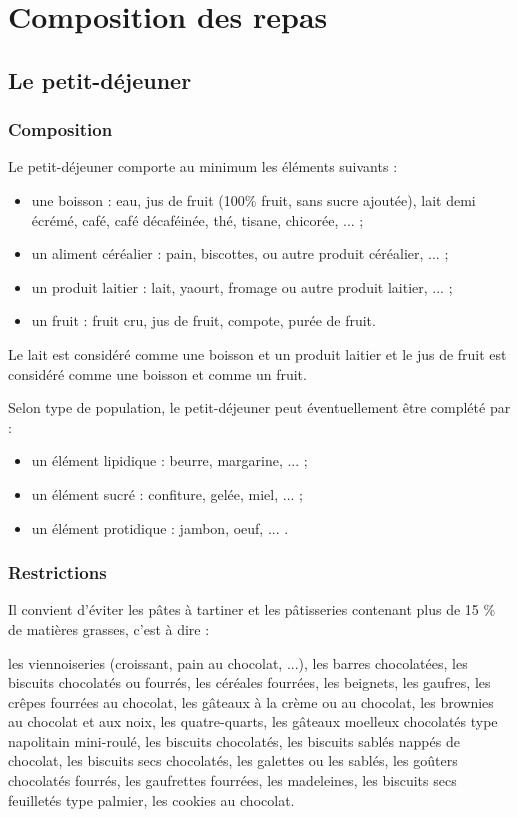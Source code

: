 \chapter{Composition des repas}

\label{annexeA}

\section{Le petit-déjeuner}

\subsection{Composition}

Le petit-déjeuner comporte au minimum les éléments suivants :
\begin{itemize}
	\item une boisson : eau, jus de fruit (100\% fruit, sans sucre ajoutée), lait demi écrémé, café, café décaféinée, thé, tisane, chicorée, ... ;
	\item un aliment céréalier : pain, biscottes, ou autre produit céréalier, ... ;
	\item un produit laitier : lait, yaourt, fromage ou autre produit laitier, ... ;
	\item un fruit : fruit cru, jus de fruit, compote, purée de fruit.
\end{itemize}

Le lait est considéré comme une boisson et un produit laitier et le jus de fruit est considéré comme une boisson et comme un fruit.

Selon type de population, le petit-déjeuner peut éventuellement être complété par :
\begin{itemize}
	\item un élément lipidique  : beurre, margarine, ... ;
	\item un élément sucré : confiture, gelée, miel, ... ;
	\item un élément protidique : jambon, oeuf, ... .
\end{itemize}

\subsection{Restrictions}

Il convient d'éviter les pâtes à tartiner et les pâtisseries contenant plus de 15 \% de matières grasses, c'est à dire :

les viennoiseries (croissant, pain au chocolat, ...), les barres chocolatées, les biscuits chocolatés ou fourrés, les céréales fourrées, les beignets, les gaufres, les crêpes fourrées au chocolat, les gâteaux à la crème ou au chocolat, les brownies au chocolat et aux noix, les quatre-quarts, les gâteaux moelleux chocolatés type napolitain mini-roulé, les biscuits chocolatés, les biscuits sablés nappés de chocolat, les biscuits secs chocolatés, les galettes ou les sablés, les goûters chocolatés fourrés, les gaufrettes fourrées, les madeleines, les biscuits secs feuilletés type palmier, les cookies au chocolat.


